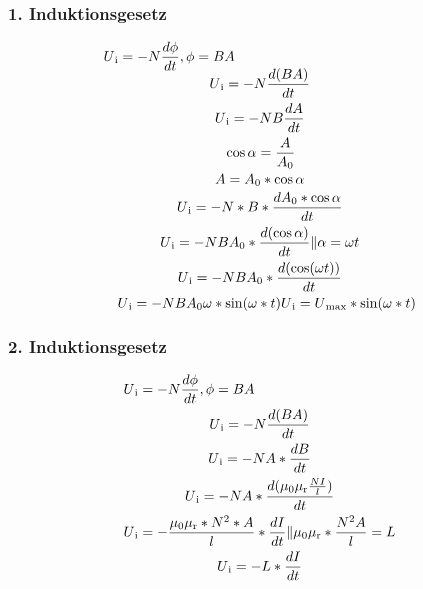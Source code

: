 \documentclass{scrartcl}
\begin{document}
        \subsubsection*{1. Induktionsgesetz}
        \begin{equation}
            \begin{multlined}
                U\textsubscript{i} = -N\frac{d\phi}{dt}, \phi =BA \\
                U\textsubscript{i} = -N\frac{d(BA)}{dt} \\
                U\textsubscript{i} = -NB\frac{dA}{dt} \\
                \cos\alpha = \frac{A}{A\textsubscript{0}} \\
                A = A\textsubscript{0}*\cos\alpha \\
                U\textsubscript{i}=-N*B*\frac{dA\textsubscript{0}*\cos\alpha}{dt} \\
                U\textsubscript{i}=-NBA\textsubscript{0}*\frac{d(\cos\alpha)}{dt} \| \alpha=\omega t \\
                U\textsubscript{i}=-NBA\textsubscript{0}*\frac{d(\cos(\omega t))}{dt} \\
                U\textsubscript{i}=-NBA\textsubscript{0}\omega*\sin(\omega*t)
                U\textsubscript{i}= U\textsubscript{$\max$}* \sin(\omega*t)
            \end{multlined}
        \end{equation}
        \subsubsection*{2. Induktionsgesetz}
            \begin{equation}
                \begin{multlined}
                    U\textsubscript{i} = -N\frac{d\phi}{dt}, \phi =BA \\
                    U\textsubscript{i} = -N\frac{d(BA)}{dt} \\
                    U\textsubscript{i} = -NA*\frac{dB}{dt} \\
                    U\textsubscript{i} = -NA*\frac{d(\mu\textsubscript{0}\mu\textsubscript{r}\frac{NI}{l})}{dt} \\
                    U\textsubscript{i} = -\frac{\mu\textsubscript{0}\mu\textsubscript{r}*N^2*A}{l}*\frac{dI}{dt} \| \mu\textsubscript{0}\mu\textsubscript{r}*\frac{N^2A}{l}=L \\
                    U\textsubscript{i} = -L*\frac{dI}{dt} \\
                \end{multlined}
            \end{equation}
\end{document}
